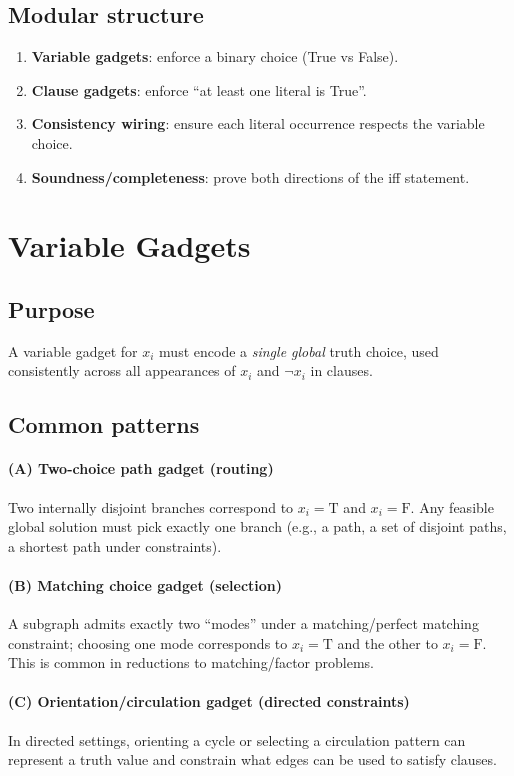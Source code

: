 \documentclass[11pt]{article}
\begin{document}
\subsection*{Modular structure}
\begin{enumerate}[itemsep=2pt]
  \item \textbf{Variable gadgets}: enforce a binary choice (True vs False).
  \item \textbf{Clause gadgets}: enforce ``at least one literal is True''.
  \item \textbf{Consistency wiring}: ensure each literal occurrence respects the variable choice.
  \item \textbf{Soundness/completeness}: prove both directions of the iff statement.
\end{enumerate}

\section{Variable Gadgets}
\subsection{Purpose}
A variable gadget for $x_i$ must encode a \emph{single global} truth choice, used consistently across all appearances of $x_i$ and $\neg x_i$ in clauses.

\subsection{Common patterns}
\paragraph{(A) Two-choice path gadget (routing)}
Two internally disjoint branches correspond to $x_i=\text{T}$ and $x_i=\text{F}$. Any feasible global solution must pick exactly one branch (e.g., a path, a set of disjoint paths, a shortest path under constraints).

\paragraph{(B) Matching choice gadget (selection)}
A subgraph admits exactly two ``modes'' under a matching/perfect matching constraint; choosing one mode corresponds to $x_i=\text{T}$ and the other to $x_i=\text{F}$. This is common in reductions to matching/factor problems.

\paragraph{(C) Orientation/circulation gadget (directed constraints)}
In directed settings, orienting a cycle or selecting a circulation pattern can represent a truth value and constrain what edges can be used to satisfy clauses.
\end{document}
